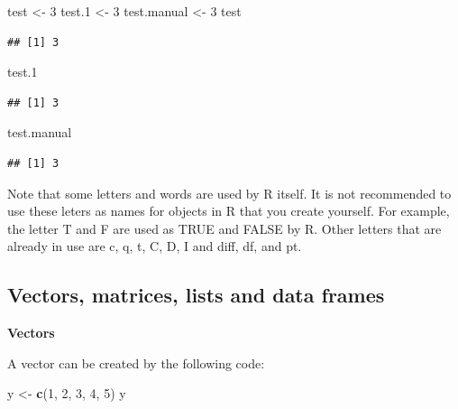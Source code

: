 \documentclass[]{book}
\newenvironment{Shaded}{\begin{snugshade}}{\end{snugshade}}
\newcommand{\KeywordTok}[1]{\textcolor[rgb]{0.13,0.29,0.53}{\textbf{#1}}}
\newcommand{\DecValTok}[1]{\textcolor[rgb]{0.00,0.00,0.81}{#1}}
\newcommand{\StringTok}[1]{\textcolor[rgb]{0.31,0.60,0.02}{#1}}
\newcommand{\NormalTok}[1]{#1}
\begin{document}
\begin{Shaded}
\begin{Highlighting}[]
\NormalTok{test <-}\StringTok{ }\DecValTok{3}
\NormalTok{test.}\DecValTok{1}\NormalTok{ <-}\StringTok{ }\DecValTok{3}
\NormalTok{test.manual <-}\StringTok{ }\DecValTok{3}
\NormalTok{test}
\end{Highlighting}
\end{Shaded}

\begin{verbatim}
## [1] 3
\end{verbatim}

\begin{Shaded}
\begin{Highlighting}[]
\NormalTok{test.}\DecValTok{1}
\end{Highlighting}
\end{Shaded}

\begin{verbatim}
## [1] 3
\end{verbatim}

\begin{Shaded}
\begin{Highlighting}[]
\NormalTok{test.manual }
\end{Highlighting}
\end{Shaded}

\begin{verbatim}
## [1] 3
\end{verbatim}

Note that some letters and words are used by R itself. It is not
recommended to use these leters as names for objects in R that you
create yourself. For example, the letter T and F are used as TRUE and
FALSE by R. Other letters that are already in use are c, q, t, C, D, I
and diff, df, and pt.

\subsection{Vectors, matrices, lists and data
frames}\label{vectors-matrices-lists-and-data-frames}

\textbf{Vectors}

A vector can be created by the following code:

\begin{Shaded}
\begin{Highlighting}[]
\NormalTok{y <-}\StringTok{ }\KeywordTok{c}\NormalTok{(}\DecValTok{1}\NormalTok{, }\DecValTok{2}\NormalTok{, }\DecValTok{3}\NormalTok{, }\DecValTok{4}\NormalTok{, }\DecValTok{5}\NormalTok{)}
\NormalTok{y}
\end{Highlighting}
\end{Shaded}
\end{document}
